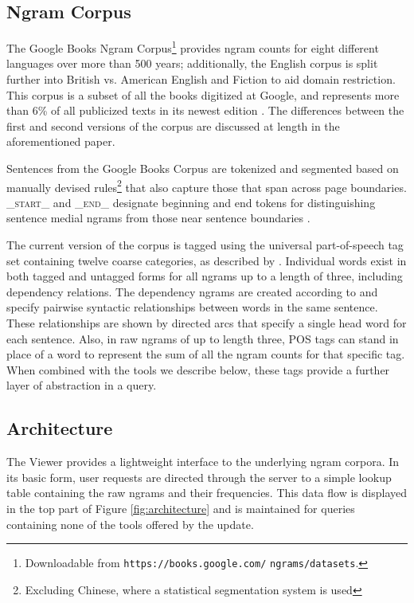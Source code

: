 \documentclass[11pt]{article}
\begin{document}
\subsection{Ngram Corpus}
	The Google Books Ngram Corpus\footnote{Downloadable from \texttt{https://books.google.com/} \texttt{ngrams/datasets}.} provides ngram counts for eight different languages over more than 500 years; additionally, the English corpus is split further into British vs. American English and Fiction to aid domain restriction. This corpus is a subset of all the books digitized at Google, and represents more than 6\% of all publicized texts in its newest edition \cite{lin2012syntactic}. The differences between the first and second versions of the corpus are discussed at length in the aforementioned paper.
	

Sentences from the Google Books Corpus are tokenized and segmented based on manually devised rules\footnote{Excluding Chinese, where a statistical segmentation system is used} that also capture those that span across page boundaries. \textsf{\textsc{\_start\_}} and \textsf{\textsc{\_end\_}} designate beginning and end tokens for distinguishing sentence medial ngrams from those near sentence boundaries \cite{lin2012syntactic}.

The current version of the corpus is tagged using the universal part-of-speech tag set containing twelve coarse categories, as described by . Individual words exist in both tagged and untagged forms for all ngrams up to a length of three, including dependency relations. The dependency ngrams are created according to  and specify pairwise syntactic relationships between words in the same sentence. These relationships are shown by directed arcs that specify a single head word for each sentence. Also, in raw ngrams of up to length three, POS tags can stand in place of a word to represent the sum of all the ngram counts for that specific tag. When combined with the tools we describe below, these tags provide a further layer of abstraction in a query.



\subsection{Architecture}
The Viewer provides a lightweight interface to the underlying ngram corpora. In its basic form, user requests are directed through the server to a simple lookup table containing the raw ngrams and their frequencies. This data flow is displayed in the top part of Figure \ref{fig:architecture} and is maintained for queries containing none of the tools offered by the update.
\end{document}
